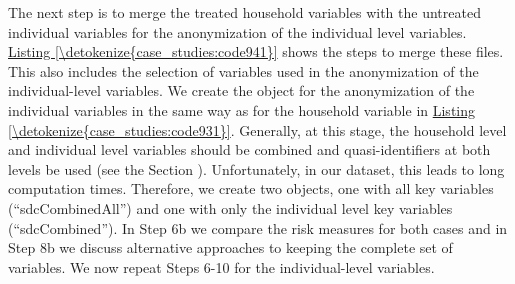 \documentclass[letterpaper,10pt,english]{sphinxmanual}
\begin{document}
The next step is to merge the treated household variables with the
untreated individual variables for the anonymization of the individual
level variables. \hyperref[\detokenize{case_studies:code941}]{Listing \ref{\detokenize{case_studies:code941}}} shows the steps to merge these files. This
also includes the selection of variables used in the anonymization of
the individual-level variables. We create the  object for the
anonymization of the individual variables in the same way as for the
household variable in \hyperref[\detokenize{case_studies:code931}]{Listing \ref{\detokenize{case_studies:code931}}}. Generally, at this stage, the
household level and individual level variables should be combined and
quasi-identifiers at both levels be used (see the Section ).
Unfortunately, in our dataset, this leads to long computation times.
Therefore, we create two  objects, one with all key variables
(“sdcCombinedAll”) and one with only the individual level key variables
(“sdcCombined”). In Step 6b we compare the risk measures for both cases
and in Step 8b we discuss alternative approaches to keeping the complete
set of variables. We now repeat Steps 6-10 for the individual-level
variables.
\end{document}
